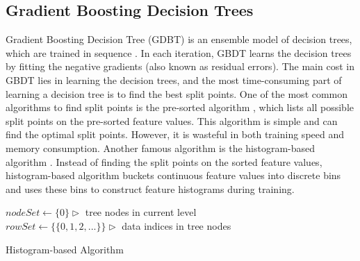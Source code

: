 \subsection{Gradient Boosting Decision Trees}
\label{ssec:gbdt}

Gradient Boosting Decision Tree (GDBT) is an ensemble model of decision trees, which are trained in sequence \cite{friedman2001greedy}. 
In each iteration, GBDT learns the decision trees by fitting the negative gradients (also known as residual errors).
The main cost in GBDT lies in learning the decision trees, and the most time-consuming part of learning a decision tree is to find the best split points.
One of the most common algorithms to find split points is the pre-sorted algorithm \cite{mehta1996sliq, shafer1996sprint}, which lists all possible split points on the pre-sorted feature values. 
This algorithm is simple and can find the optimal split points.
However, it is wasteful in both training speed and memory consumption. Another famous algorithm is the histogram-based
algorithm \cite{ranka1998clouds, jin2003communication, li2008mcrank}. 
Instead of finding the split points on the sorted feature values, histogram-based algorithm buckets continuous feature values into discrete bins and uses these bins to construct feature histograms during training.

\bigskip
\begin{algorithm}[H]
 $nodeSet \leftarrow \{0\} \triangleright$ tree nodes in current level \\
 $rowSet \leftarrow \{\{0, 1, 2, ...\}\} \triangleright$ data indices in tree nodes \\
 \caption{Histogram-based Algorithm}
 \label{alg:histogram-based}
\end{algorithm}
\bigskip

